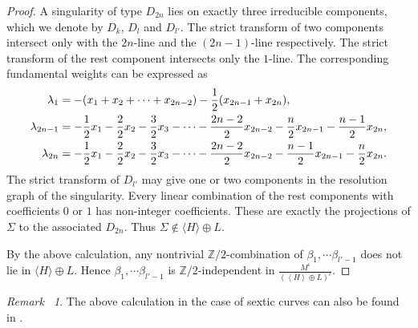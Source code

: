 \documentclass[12pt,reqno,a4paper]{amsart}
\theoremstyle{remark}
\newtheorem{rmk}[thm]{Remark~}
\theoremstyle{definition}
\newcommand{\ZZ}{\mathbb{Z}}
\begin{document}
\begin{proof}
A singularity of type $D_{2n}$ lies on exactly three irreducible components, which we denote by $D_k$, $D_l$ and $D_{l'}$.
The strict transform of two components intersect only with the $2n$-line and the $(2n-1)$-line respectively. 
The strict transform of the rest component intersects only the $1$-line.
The corresponding fundamental weights can be expressed as
\begin{align*}
    \lambda_1 &= -(x_1+x_2+\cdots+x_{2n-2})-{1\over 2}(x_{2n-1}+x_{2n}), \\
    \lambda_{2n-1} &= -{1\over 2}x_1 - {2\over 2}x_2 - {3\over 2}x_3 - \cdots - {2n-2\over 2}x_{2n-2} - {n\over 2}x_{2n-1} - {n-1\over 2}x_{2n}, \\
    \lambda_{2n} &= -{1\over 2}x_1 - {2\over 2}x_2 - {3\over 2}x_3 - \cdots - {2n-2\over 2}x_{2n-2} - {n-1\over 2}x_{2n-1} - {n\over 2}x_{2n}. \\
\end{align*}
The strict transform of $D_{l'}$ may give one or two components in the resolution graph of the singularity.
Every linear combination of the rest components with coefficients $0$ or $1$ has non-integer coefficients.
These are exactly the projections of $\Sigma$ to the associated $D_{2n}$. Thus $\Sigma\notin \langle H\rangle\oplus L$.



    By the above calculation, any nontrivial $\ZZ/2$-combination of $\beta_1,\cdots\beta_{l'-1}$ does not lie in $\langle H\rangle\oplus L$.
    Hence $\beta_1,\cdots\beta_{l'-1}$ is $\ZZ/2$-independent in $\frac{M^{\iota}}{(\left\langle H \right\rangle\oplus L)^{\iota}}$.
\end{proof}
\begin{rmk}
    The above calculation in the case of sextic curves can also be found in \cite[\S 3, Tabel 1]{yang1996sextic}.
\end{rmk}
\end{document}
